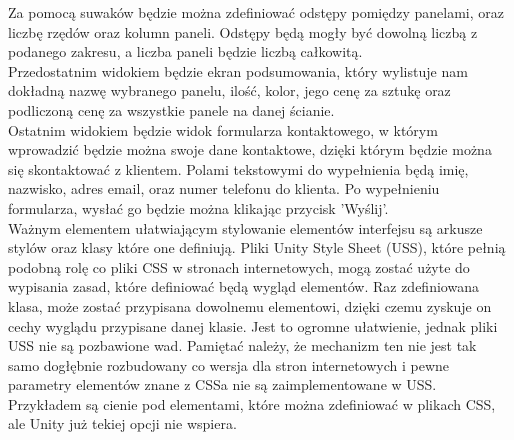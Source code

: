 \documentclass{article} %
\begin{document}
            Za pomocą suwaków będzie można zdefiniować odstępy pomiędzy panelami, oraz liczbę rzędów oraz kolumn paneli. Odstępy będą mogły być dowolną liczbą z podanego zakresu, a liczba paneli będzie liczbą całkowitą.
            \\
            
            Przedostatnim widokiem będzie ekran podsumowania, który wylistuje nam dokładną nazwę wybranego panelu, ilość, kolor, jego cenę za sztukę oraz podliczoną cenę za wszystkie panele na danej ścianie.
            \\
            
            Ostatnim widokiem będzie widok formularza kontaktowego, w którym wprowadzić będzie można swoje dane kontaktowe, dzięki którym będzie można się skontaktować z klientem. Polami tekstowymi do wypełnienia będą imię, nazwisko, adres email, oraz numer telefonu do klienta. Po wypełnieniu formularza, wysłać go będzie można klikając przycisk 'Wyślij'.
            \\
            
            Ważnym elementem ułatwiającym stylowanie elementów interfejsu są arkusze stylów oraz klasy które one definiują. Pliki Unity 
            Style Sheet (USS), które pełnią podobną rolę co pliki CSS w stronach internetowych, mogą zostać użyte do wypisania zasad, które definiować będą wygląd elementów. Raz zdefiniowana klasa, może zostać przypisana dowolnemu elementowi, dzięki czemu zyskuje on cechy wyglądu przypisane danej klasie. Jest to ogromne ułatwienie, jednak pliki USS nie są pozbawione wad. Pamiętać należy, że mechanizm ten nie jest tak samo dogłębnie rozbudowany co wersja dla stron internetowych i pewne parametry elementów znane z CSSa nie są zaimplementowane w USS. Przykładem są cienie pod elementami, które można zdefiniować w plikach CSS, ale Unity już tekiej opcji nie wspiera.
            \\
            
\end{document}
